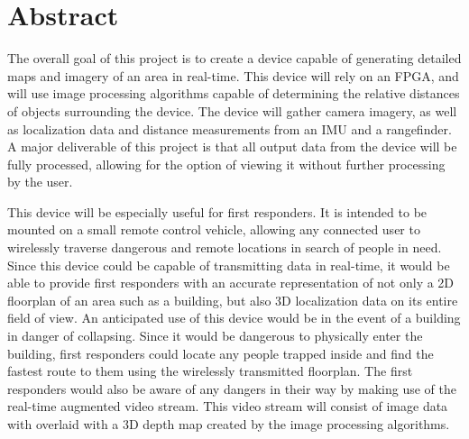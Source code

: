 {}
\section*{Abstract}
The overall goal of this project is to create a device capable of generating detailed maps and imagery of an area in real-time. This device will rely on an FPGA, and will use image processing algorithms capable of determining the relative distances of objects surrounding the device. The device will gather camera imagery, as well as localization data and distance measurements from an IMU and a rangefinder.  A major deliverable of this project is that all output data from the device will be fully processed, allowing for the option of viewing it without further processing by the user.
\par
This device will be especially useful for first responders. It is intended to be mounted on a small remote control vehicle, allowing any connected user to wirelessly traverse dangerous and remote locations in search of people in need. Since this device could be capable of transmitting data in real-time, it would be able to provide first responders with an accurate representation of not only a 2D floorplan of an area such as a building, but also 3D localization data on its entire field of view. An anticipated use of this device would be in the event of a building in danger of collapsing. Since it would be dangerous to physically enter the building, first responders could locate any people trapped inside and find the fastest route to them using the wirelessly transmitted floorplan. The first responders would also be aware of any dangers in their way by making use of the real-time augmented video stream. This video stream will consist of image data with overlaid with a 3D depth map created by the image processing algorithms.